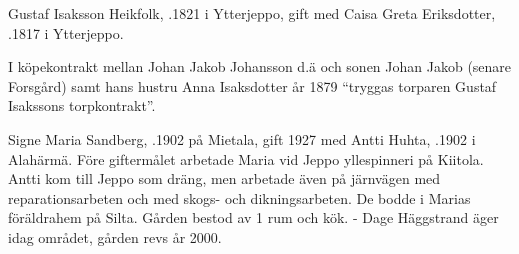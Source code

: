 %
Gustaf Isaksson Heikfolk, .1821 i Ytterjeppo, gift med Caisa Greta Eriksdotter, .1817 i Ytterjeppo.
\begin{jhchildren}
  \item {}
  \item {}
  \item {}
  \item {}
  \item {}
  \item {}
  \item {}
  \item {}
  \item {}
\end{jhchildren}
I köpekontrakt mellan Johan Jakob Johansson d.ä och sonen Johan Jakob (senare Forsgård) samt hans hustru Anna Isaksdotter år 1879 ``tryggas torparen Gustaf Isakssons torpkontrakt''.



%



%
Signe Maria Sandberg, .1902 på Mietala, gift 1927 med Antti Huhta, .1902 i Alahärmä. Före giftermålet arbetade Maria vid Jeppo yllespinneri på Kiitola. Antti kom till Jeppo som dräng, men arbetade även på järnvägen med reparationsarbeten och med skogs- och dikningsarbeten. De bodde i Marias föräldrahem på Silta. Gården bestod av 1 rum och kök. - Dage Häggstrand äger idag området, gården revs år 2000.
\begin{jhchildren}
  \item {}
  \item {}
  \item {}
\end{jhchildren}

